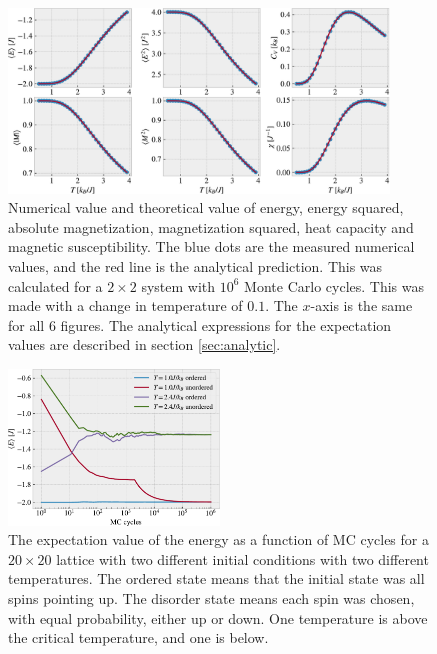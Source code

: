 \documentclass[%
 reprint,
nofootinbib,
aps,
]{revtex4-1}
\begin{document}
\begin{figure}
\centering
\includegraphics[width=0.9\textwidth]{../figures/taskb.pdf}
\caption{Numerical value and theoretical value of energy, energy squared, absolute magnetization, magnetization squared, heat capacity and magnetic susceptibility. The blue dots are the measured numerical values, and the red line is the analytical prediction. This was calculated for a $2\times 2$ system with $10^6$ Monte Carlo cycles. This was made with a change in temperature of $0.1$. The $x$-axis is the same for all $6$ figures. The analytical expressions for the expectation values are described in section \vref{sec:analytic}.}
\label{fig:2times2}
\end{figure}
\begin{figure}
  \centering
  \includegraphics[width=0.5\textwidth]{../figures/problem_c_E.pdf}
  \caption{The expectation value of the energy as a function of MC cycles for a $20\times 20$ lattice with two different initial conditions with two different temperatures. The ordered state means that the initial state was all spins pointing up. The disorder state means each spin was chosen, with equal probability, either up or down. One temperature is above the critical temperature, and one is below.}
  \label{fig:problem_c_E}
\end{figure}
\end{document}
